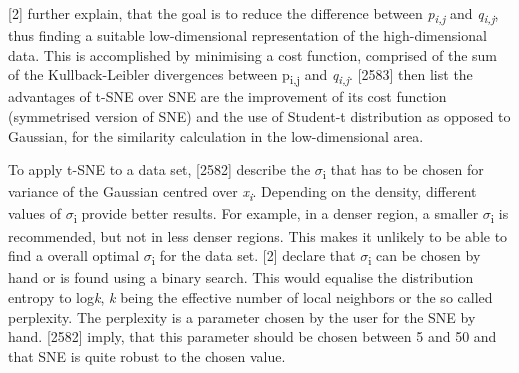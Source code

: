\textcite{hinton2003stochastic}[2] further explain, that the goal is to reduce the difference between \textit{p\textsubscript{i,j}} and \textit{q\textsubscript{i,j}}, thus finding a suitable low-dimensional representation of the high-dimensional data. This is accomplished by minimising a cost function, comprised of the sum of the Kullback-Leibler divergences between {p\textsubscript{i,j}} and \textit{q\textsubscript{i,j}}. 
\textcite{maaten2008visualizing}[2583] then list the advantages of t-SNE over SNE are the improvement of its cost function (symmetrised version of SNE) and the use of Student-t distribution as opposed to Gaussian, for the similarity calculation in the low-dimensional area.

To apply t-SNE to a data set, \textcite{maaten2008visualizing}[2582] describe the $\sigma$\textsubscript{i} that has to be chosen for variance of the Gaussian centred over \textit{x\textsubscript{i}}. Depending on the density, different values of $\sigma$\textsubscript{i} provide better results. For example, in a denser region, a smaller $\sigma$\textsubscript{i} is recommended, but not in less denser regions. This makes it unlikely to be able to find a overall optimal  $\sigma$\textsubscript{i} for the data set. \textcite{hinton2003stochastic}[2] declare that $\sigma$\textsubscript{i} can be chosen by hand or is found using a binary search. This would equalise the distribution entropy to log\textit{k}, \textit{k} being the effective number of local neighbors or the so called perplexity. The perplexity is a parameter chosen by the user for the SNE by hand. \textcite{maaten2008visualizing}[2582] imply, that this parameter should be chosen between 5 and 50 and that SNE is quite robust to the chosen value. 

